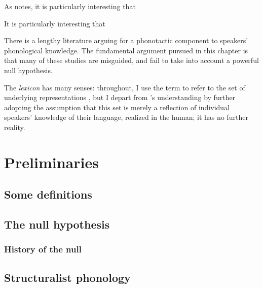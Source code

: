 As \citeauthor{Wright1975} notes, it is particularly interesting that 

It is particularly interesting that 


There is a lengthy literature arguing for a phonotactic component to speakers' phonological knowledge. The fundamental argument pursued in this chapter is that many of these studies are misguided, and fail to take into account a powerful null hypothesis.

The \emph{lexicon} has many senses: throughout, I use the term to refer to the set of underlying representations \citep[][269]{LANGUAGE}, but I depart from \citeauthor{LANGUAGE}'s understanding by further adopting the assumption that this set is merely a reflection of individual speakers' knowledge of their language, realized in the human; it has no further reality.

\section{Preliminaries}

\subsection{Some definitions}

\subsection{The null hypothesis}

\subsubsection{History of the null}

\subsection{Structuralist phonology}

